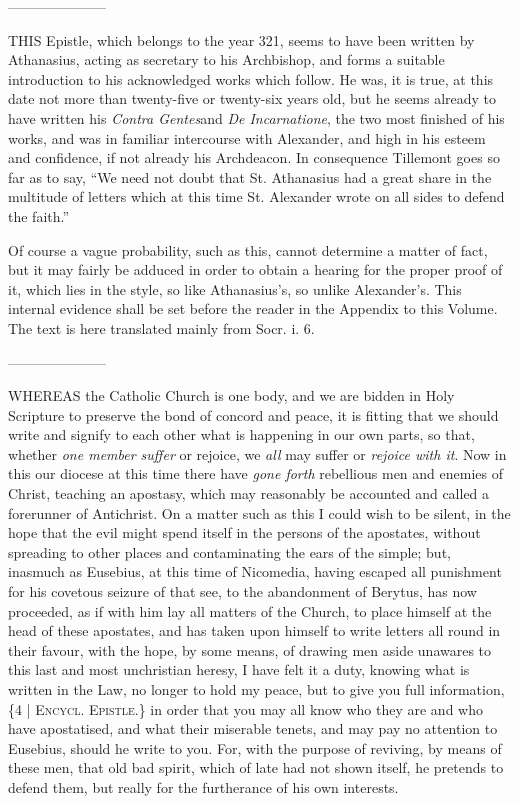 
———————


THIS
Epistle, which belongs to the year 321, seems to have been written by
Athanasius, acting as secretary to his Archbishop, and forms a
suitable introduction to his acknowledged works which follow. He was,
it is true, at this date not more than twenty-five or twenty-six years
old, but he seems already to have written his \emph{Contra Gentes}and
\emph{De Incarnatione}, the two most finished of his works, and was in
familiar intercourse with Alexander, and high in his esteem and
confidence, if not already his Archdeacon. In consequence Tillemont
goes so far as to say, ``We need not doubt that St. Athanasius had a
great share in the multitude of letters which at this time St.
Alexander wrote on all sides to defend the faith.''

Of course a vague probability, such
as this, cannot determine a matter of fact, but it may fairly be
adduced in order to obtain a hearing for the proper proof of it, which
lies in the style, so like Athanasius's, so unlike Alexander's.
This internal evidence shall be set before the reader in the Appendix
to this Volume. The text is here translated mainly from Socr. i. 6.


———————

WHEREAS
the Catholic Church is one body, and we are bidden in Holy Scripture
to preserve the bond of concord and peace, it is fitting that we
should write and signify to each other what is happening in our own
parts, so that, whether \emph{one member suffer} or rejoice, we \emph{all}
may suffer or \emph{rejoice with it}. Now in this our diocese at this
time there have \emph{gone forth} rebellious men and enemies of
Christ, teaching an apostasy, which may reasonably be accounted and
called a forerunner of Antichrist. On a matter such as this I could
wish to be silent, in the hope that the evil might spend itself in the
persons of the apostates, without spreading to other places and
contaminating the ears of the simple; but, inasmuch as Eusebius, at
this time of Nicomedia, having escaped all punishment for his
covetous seizure of that see, to the abandonment of Berytus, has now
proceeded, as if with him lay all matters of the Church, to place
himself at the head of these apostates, and has taken upon himself to
write letters all round in their favour, with the hope, by some means,
of drawing men aside unawares to this last and most unchristian
heresy, I have felt it a duty, knowing what is written in the Law, no
longer to hold my peace, but to give you full information, \{4 | E\textsc{ncycl}.
E\textsc{pistle}.\} in
order that you may all know who they are and who have apostatised, and
what their miserable tenets, and may pay no attention to Eusebius,
should he write to you. For, with the purpose of reviving, by means of
these men, that old bad spirit, which of late had not shown itself, he
pretends to defend them, but really for the furtherance of his own
interests.

